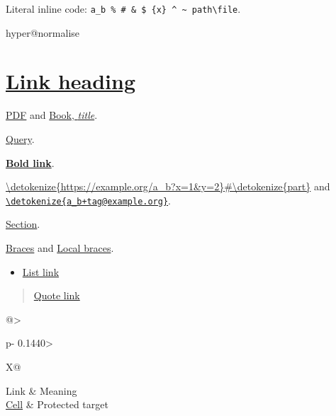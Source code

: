Literal inline code: \texttt{a\_b \% \# \& \$ \{x\} \textasciicircum{} \textasciitilde{} path\textbackslash{}file}.

\ifcsname hyper@normalise\endcsname\else\PackageError{mark2tex}{Markdown links require hyperref}{Load \string\usepackage{hyperref} in the document preamble.}\fi
\section{\href{\detokenize{https://example.org/heading}}{Link heading}}

\href{\detokenize{unterlagen/Auswahl der Inhalte.pdf}}{PDF} and \href{\detokenize{books/Book_name.pdf}}{Book, \emph{title}}.

\href{\detokenize{https://example.org/a}\%\detokenize{20b}\%\detokenize{20c?x=1&y=$@_}\#\detokenize{frag}}{Query}.

\textbf{\href{\detokenize{https://example.org/bold}\%\detokenize{20text?a=1&b=2}\#\detokenize{part}}{Bold link}}.

\url{\detokenize{https://example.org/a_b?x=1&y=2}\#\detokenize{part}} and \href{\detokenize{mailto:a_b+tag@example.org}}{\nolinkurl{\detokenize{a_b+tag@example.org}}}.

\hyperref[\detokenize{grundlagen}]{Section}.

\href{\detokenize{https://example.org/a}\Uchar123 \detokenize{b}\Uchar125 \Uchar94 \Uchar94 \detokenize{c}\Uchar92 \detokenize{d}}{Braces} and \href{\detokenize{unterlagen/a}\Uchar123 \detokenize{b}\Uchar125 \detokenize{.pdf}}{Local braces}.

\begin{itemize}
\item \href{\detokenize{https://example.org/list}}{List link}
\end{itemize}

\begin{quote}
\href{\detokenize{https://example.org/quote}}{Quote link}
\end{quote}

\par\addvspace{\medskipamount}
\noindent\begin{tabularx}{\linewidth}{@{}>{\raggedright\arraybackslash}p{}>{\raggedright\arraybackslash}X@{}}
\toprule
Link & Meaning \\
\midrule
\href{\detokenize{https://example.org/$@_}}{Cell} & Protected target \\
\bottomrule
\end{tabularx}
\par\addvspace{\medskipamount}

